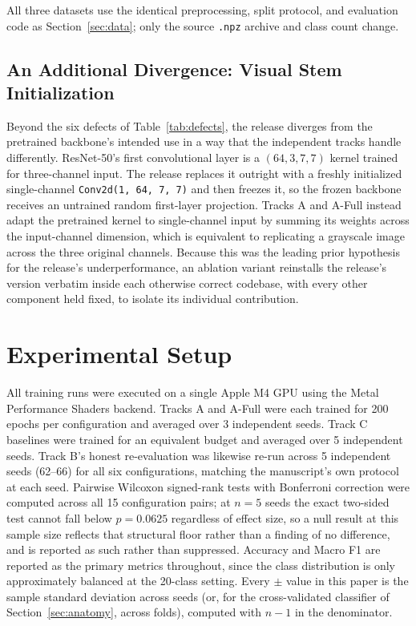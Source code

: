 \documentclass[journal]{IEEEtran}
\begin{document}
All three datasets use the identical preprocessing, split protocol, and evaluation code as Section~\ref{sec:data}; only the source \texttt{.npz} archive and class count change.

\subsection{An Additional Divergence: Visual Stem Initialization}\label{sec:mstem}
Beyond the six defects of Table~\ref{tab:defects}, the release diverges from the pretrained backbone's intended use in a way that the independent tracks handle differently. ResNet-50's first convolutional layer is a $(64, 3, 7, 7)$ kernel trained for three-channel input. The release replaces it outright with a freshly initialized single-channel \texttt{Conv2d(1, 64, 7, 7)} and then freezes it, so the frozen backbone receives an untrained random first-layer projection. Tracks A and A-Full instead adapt the pretrained kernel to single-channel input by summing its weights across the input-channel dimension, which is equivalent to replicating a grayscale image across the three original channels. Because this was the leading prior hypothesis for the release's underperformance, an ablation variant reinstalls the release's version verbatim inside each otherwise correct codebase, with every other component held fixed, to isolate its individual contribution.

\section{Experimental Setup}\label{sec:setup}

All training runs were executed on a single Apple M4 GPU using the Metal Performance Shaders backend. Tracks A and A-Full were each trained for 200 epochs per configuration and averaged over 3 independent seeds. Track C baselines were trained for an equivalent budget and averaged over 5 independent seeds. Track B's honest re-evaluation was likewise re-run across 5 independent seeds (62--66) for all six configurations, matching the manuscript's own protocol at each seed. Pairwise Wilcoxon signed-rank tests with Bonferroni correction were computed across all 15 configuration pairs; at $n=5$ seeds the exact two-sided test cannot fall below $p=0.0625$ regardless of effect size, so a null result at this sample size reflects that structural floor rather than a finding of no difference, and is reported as such rather than suppressed. Accuracy and Macro F1 are reported as the primary metrics throughout, since the class distribution is only approximately balanced at the 20-class setting. Every $\pm$ value in this paper is the sample standard deviation across seeds (or, for the cross-validated classifier of Section~\ref{sec:anatomy}, across folds), computed with $n-1$ in the denominator.
\end{document}
